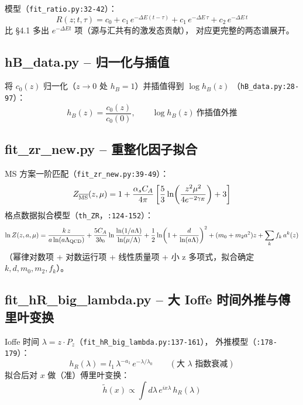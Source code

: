 \documentclass[UTF8]{ctexart}
\begin{document}
模型（\texttt{fit\_ratio.py:32-42}）：
\begin{equation}
  R(z;t,\tau) = c_0 + c_1\,e^{-\Delta E(t-\tau)} + c_1\,e^{-\Delta E\,\tau}
  + c_2\,e^{-\Delta E\,t}
\end{equation}
比 \S4.1 多出 $e^{-\Delta E t}$ 项（源与汇共有的激发态贡献），
对应更完整的两态谱展开。

\subsection{hB\_data.py -- 归一化与插值}

将 $c_0(z)$ 归一化（$z\to 0$ 处 $h_B=1$）并插值得到 $\log h_B(z)$
（\texttt{hB\_data.py:28-97}）：
\begin{equation}
  h_B(z) = \frac{c_0(z)}{c_0(0)},\qquad \log h_B(z)\ \text{作插值外推}
\end{equation}

\subsection{fit\_zr\_new.py -- 重整化因子拟合}

MS 方案一阶匹配（\texttt{fit\_zr\_new.py:39-49}）：
\begin{equation}
  Z_{\overline{\rm MS}}(z,\mu) = 1 + \frac{\alpha_s C_A}{4\pi}
  \left[\frac53\ln\!\left(\frac{z^2\mu^2}{4e^{-2\gamma_E}}\right) + 3\right]
\end{equation}
格点数据拟合模型（\texttt{th\_ZR}，\texttt{:124-152}）：
\begin{equation}
  \ln Z(z,a,\mu) = \frac{k\,z}{a\ln(a\Lambda_{\rm QCD})}
  + \frac{5C_A}{3b_0}\ln\frac{\ln(1/a\Lambda)}{\ln(\mu/\Lambda)}
  + \frac12\ln\!\left(1+\frac{d}{\ln(a\Lambda)}\right)^2
  + (m_0+m_2 a^2)z + \sum_k f_k\,a^k(z)
\end{equation}
（幂律对数项 + 对数运行项 + 线性质量项 + 小 z 多项式，拟合确定
$k,d,m_0,m_2,f_k$）。

\subsection{fit\_hR\_big\_lambda.py -- 大 Ioffe 时间外推与傅里叶变换}

Ioffe 时间 $\lambda = z\cdot P_z$（\texttt{fit\_hR\_big\_lambda.py:137-161}），
外推模型（\texttt{:178-179}）：
\begin{equation}
  h_R(\lambda) = l_1\,\lambda^{-a_1}\,e^{-\lambda/\lambda_0}
  \qquad (\text{大 }\lambda\text{ 指数衰减})
\end{equation}
拟合后对 $x$ 做（准）傅里叶变换：
\begin{equation}
  \tilde h(x) \propto \int d\lambda\, e^{i x\lambda}\, h_R(\lambda)
\end{equation}
\end{document}
